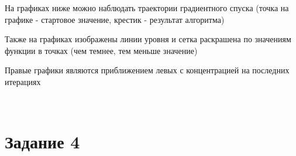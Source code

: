 \documentclass{article}
\begin{document}
На графиках ниже можно наблюдать траектории градиентного спуска (точка
на графике - стартовое значение, крестик - результат алгоритма)

Также на графиках изображены линии уровня и сетка раскрашена по
значениям функции в точках (чем темнее, тем меньше значение)

Правые графики являются приближением левых с концентрацией на последних
итерациях

    \begin{center}
    \end{center}
    { \hspace*{\fill} \\}
    
    \newpage

\hypertarget{ux437ux430ux434ux430ux43dux438ux435-4}{%
\section{Задание 4}\label{ux437ux430ux434ux430ux43dux438ux435-4}}
\end{document}
